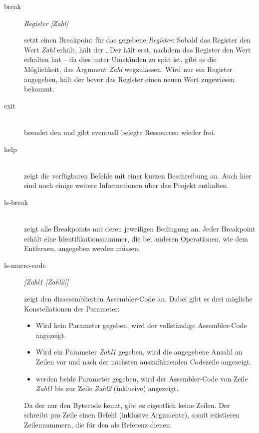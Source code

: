 \begin{description}
\item[break] \emph{Register [Zahl]}

  setzt einen Breakpoint für das gegebene \emph{Register}: Sobald das Register den Wert \emph{Zahl} erhält, hält der \md. Der \md hält erst, nachdem das Register den Wert erhalten hat -- da dies unter Umständen zu spät ist, gibt es die Möglichkeit, das Argument \emph{Zahl} wegzulassen. Wird nur ein Register angegeben, hält der \md bevor das Register einen neuen Wert zugewiesen bekommt.

\item[exit] \hspace*{\fill}\\

  beendet den \md und gibt eventuell belegte Ressourcen wieder frei.

\item[help] \hspace*{\fill}\\

  zeigt die verfügbaren Befehle mit einer kurzen Beschreibung an. Auch hier sind noch einige weitere Informationen über das Projekt enthalten.

\item[ls-break] \hspace*{\fill}\\

  zeigt alle Breakpoints mit deren jeweiligen Bedingung an. Jeder Breakpoint erhält eine Identifikationsnummer, die bei anderen Operationen, wie dem Entfernen, angegeben werden müssen.

\item[ls-macro-code] \emph{[Zahl1 [Zahl2]]}

  zeigt den disassemblierten Assembler-Code an. Dabei gibt es drei mögliche Konstellationen der Parameter:
  \begin{itemize}
  \item Wird kein Parameter gegeben, wird der vollständige Assembler-Code angezeigt.
  \item Wird ein Parameter \emph{Zahl1} gegeben, wird die angegebene Anzahl an Zeilen vor und nach der nächsten auszuführenden Codezeile angezeigt.
  \item werden beide Parameter gegeben, wird der Assembler-Code von Zeile \emph{Zahl1} bis zur Zeile \emph{Zahl2} (inklusive) angezeigt.
  \end{itemize}

  Da der \md nur den Bytecode kennt, gibt es eigentlich keine Zeilen. Der \md schreibt pro Zeile einen Befehl (inklusive Argumente), somit existieren Zeilennummern, die für den \md als Referenz dienen.


\end{description}
